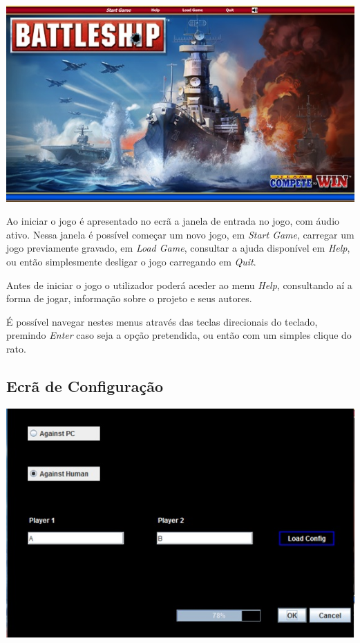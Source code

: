 \documentclass[12pt,a4paper,reqno]{report}
\numberwithin{equation}{section}
\begin{document}
\begin{center}

\includegraphics[width=16cm]{ecrainicial.jpg}

\end{center}

Ao iniciar o jogo é apresentado no ecrã a janela de entrada no jogo, com áudio ativo. Nessa janela é possível começar um novo jogo, em \emph{Start Game}, carregar um jogo previamente gravado, em \emph{Load Game}, consultar a ajuda disponível em \emph{Help}, ou então simplesmente desligar o jogo carregando em \emph{Quit}.

Antes de iniciar o jogo o utilizador poderá aceder ao menu \emph{Help}, consultando aí a forma de jogar, informação sobre o projeto e seus autores.

É possível navegar nestes menus através das teclas direcionais do teclado, premindo \emph{Enter} caso seja a opção pretendida, ou então com um simples clique do rato.

\subsection{Ecrã de Configuração}

\begin{center}

\includegraphics[width=16cm]{configuracao.jpg}

\end{center}
\end{document}
